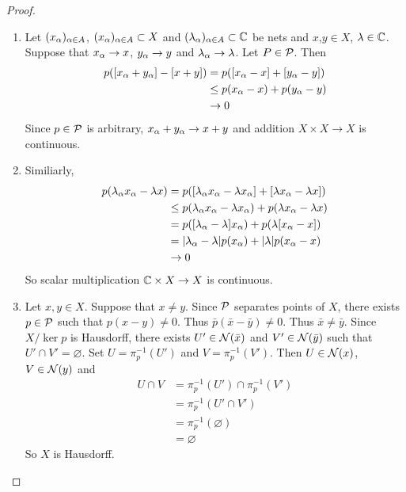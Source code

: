 \documentclass{book}
\begin{document}
	\begin{proof}\
		\begin{enumerate}
			\item Let $(x_{\alpha})_{\alpha \in A}$, $(x_{\alpha})_{\alpha \in A} \subset X$ and $(\lambda_{\alpha})_{\alpha \in A} \subset \mathbb{C}$ be nets and $x$,$y \in X$, $\lambda \in \mathbb{C}$. Suppose that $x_{\alpha} \rightarrow x$, $y_{\alpha} \rightarrow y$ and $\lambda_{\alpha} \rightarrow \lambda$. Let $P \in \mathcal{P}$. Then 
			\begin{align*}
				p([x_{\alpha} + y_{\alpha}] - [x + y]) 
				&= p([x_{\alpha} - x] + [y_{\alpha} - y]) \\
				&\leq p(x_{\alpha} - x) + p(y_{\alpha} - y) \\
				& \rightarrow 0
			\end{align*}
			Since $p \in \mathcal{P}$ is arbitrary, $x_{\alpha} + y_{\alpha} \rightarrow x + y$ and addition $X \times X \rightarrow X$ is continuous. \\
			
			\item Similiarly, 
			\begin{align*}
				p(\lambda_{\alpha} x_{\alpha} - \lambda x) 
				&= p([\lambda_{\alpha} x_{\alpha} - \lambda x_{\alpha}] + [\lambda x_{\alpha} - \lambda x]) \\
				& \leq p(\lambda_{\alpha} x_{\alpha} - \lambda x_{\alpha}) + p(\lambda x_{\alpha} - \lambda x) \\
				&= p([\lambda_{\alpha} - \lambda] x_{\alpha}) + p(\lambda [x_{\alpha} - x]) \\
				&= |\lambda_{\alpha} - \lambda|p(x_{\alpha}) + |\lambda|p(x_{\alpha} - x) \\
				&\rightarrow 0 
			\end{align*}
			So scalar multiplication $ \mathbb{C} \times X \rightarrow X$ is  continuous. \\

			\item Let $x, y \in X$. Suppose that $x \neq y$. Since $\mathcal{P}$ separates points of $X$, there exists $p \in \mathcal{P}$ such that $p(x - y) \neq 0$. Thus $\bar{p}(\bar{x} - \bar{y}) \neq 0$. Thus $\bar{x} \neq \bar{y}$. Since $X / \ker p$ is Hausdorff, there exists $U' \in \mathcal{N}(\bar{x})$ and $V' \in \mathcal{N}(\bar{y})$ such that $U' \cap V' = \varnothing$. Set $U = \pi_p^{-1}(U')$ and $V =  \pi_p^{-1}(V')$. Then $U \in \mathcal{N}(x)$, $V \in \mathcal{N}(y)$ and  
			\begin{align*}
				U \cap V 
				&= \pi_p^{-1}(U') \cap  \pi_p^{-1}(V') \\
				&=  \pi_p^{-1}(U' \cap V') \\
				&=  \pi_p^{-1}(\varnothing) \\
				&= \varnothing
			\end{align*}
			So $X$ is Hausdorff.
		\end{enumerate}
	\end{proof}
\end{document}
